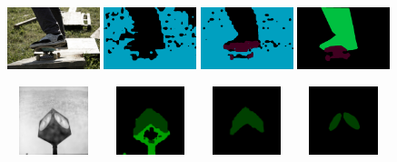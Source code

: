 \begin{figure}[p!]
  {\includegraphics[width=0.24\textwidth, height=1.8cm]{figures/experiments/coco/image/0038.jpg}}
  {\includegraphics[width=0.24\textwidth,height=1.8cm]{figures/experiments/coco/orgckpt/0038.png}}
  {\includegraphics[width=0.24\textwidth, height=1.8cm]{figures/experiments/coco/nonnoisy/0038.png}}
  {\includegraphics[width=0.24\textwidth, height=1.8cm]{figures/experiments/coco/gt/000000003553_instanceTrainIds.png}}

  {\includegraphics[width=0.24\textwidth, height=2cm]{figures/experiments/coco/image/0080.jpg}}
  {\includegraphics[width=0.24\textwidth, height=2cm]{figures/experiments/coco/orgckpt/0080.png}}
  {\includegraphics[width=0.24\textwidth, height=2cm]{figures/experiments/coco/nonnoisy/0080.png}}
  {\includegraphics[width=0.24\textwidth, height=2cm]{figures/experiments/coco/gt/000000007888_instanceTrainIds.png}}


\end{figure}
